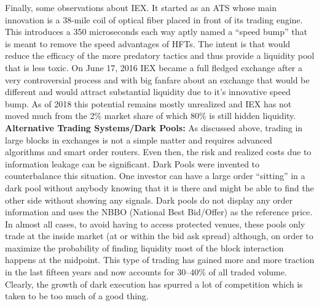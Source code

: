 Finally, some observations about IEX. It started as an ATS whose main innovation is a 38-mile coil of optical fiber placed in front of its trading engine. This introduces a 350 microseconds each way aptly named a ``speed bump'' that is meant to remove the speed advantages of HFTs. The intent is that would reduce the efficacy of the more predatory tactics and thus provide a liquidity pool that is less toxic. On June 17, 2016 IEX became a full fledged exchange after a very controversial process and with big fanfare about an exchange that would be different and would attract substantial liquidity due to it's innovative speed bump. As of 2018 this potential remains mostly unrealized and IEX has not moved much from the 2\% market share of which 80\% is still hidden liquidity. \\



\noindent\textbf{Alternative Trading Systems/Dark Pools:} As discussed above, trading in large blocks in exchanges is not a simple matter and requires advanced algorithms and smart order routers. Even then, the risk and realized costs due to information leakage can be significant. Dark Pools were invented to counterbalance this situation. One investor can have a large order ``sitting'' in a dark pool without anybody knowing that it is there and might be able to find the other side without showing any signals. Dark pools do not display any order information and uses the NBBO (National Best Bid/Offer) as the reference price. In almost all cases, to avoid having to access protected venues, these pools only trade at the inside market (at or within the bid ask spread) although, on order to maximize the probability of finding liquidity most of the block interaction happens at the midpoint. This type of trading has gained more and more traction in the last fifteen years and now accounts for 30--40\% of all traded volume. Clearly, the growth of dark execution has spurred a lot of competition which is taken to be too much of a good thing. 



